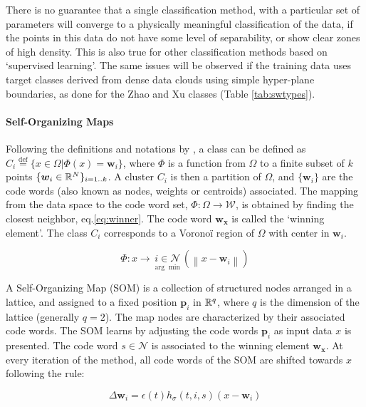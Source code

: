 There is no guarantee that a single classification method, with a particular set of parameters will converge to a physically meaningful classification of the data, if the points in this data do not have some level of separability, or show clear zones of high density. This is also true for other classification methods based on `supervised learning'. The same issues will be observed if the training data uses target classes derived from dense data clouds using simple hyper-plane boundaries, as done for the Zhao and Xu classes (Table \ref{tab:swtypes}).

\paragraph{Self-Organizing Maps}
Following the definitions and notations by \citep{[REF 23 in ROUGIER??]}, a class can be defined as $C_i\overset{\text{def}}{=} \{x\in\Omega | \Phi(x)=\boldsymbol{w}_i\}$, where $\Phi$ is a function from $\Omega$ to a finite subset of $k$ points $\{\boldsymbol{w}_i\in\Bbb R^N\}_{i=1..k}$. A cluster $C_i$ is then a partition of $\Omega$, and $\{\boldsymbol{w}_i\}$ are the code words (also known as nodes, weights or centroids) associated. The mapping from the data space to the code word set, $\Phi: \Omega\rightarrow\mathcal{W}$, is obtained by finding the closest neighbor, eq.\eqref{eq:winner}. The code word $\boldsymbol{w_x}$ is called the `winning element'. The class $C_i$ corresponds to a Vorono\"i region of $\Omega$ with center in $\boldsymbol{w}_i$.

\begin{equation}
\Phi: x \rightarrow  \underset{\arg\min}{i\in\mathcal{N}}\left( \left\lVert x - \boldsymbol{w}_i \right\rVert \right) \label{eq:winner}
\end{equation}

A Self-Organizing Map (SOM) is a collection of structured nodes arranged in a lattice, and assigned to a fixed position $\boldsymbol{p}_i$ in $\Bbb R^q$, where $q$ is the dimension of the lattice (generally $q=2$). The map nodes are characterized by their associated code words. The SOM learns by adjusting the code words $\boldsymbol{p}_i$ as input data $x$ is presented. The code word $s \in \mathcal{N}$ is associated to the winning element $\boldsymbol{w_x}$. At every iteration of the method, all code words of the SOM are shifted towards $x$ following the rule:

\begin{equation}
\Delta \boldsymbol{w}_i = \epsilon(t)h_\sigma(t,i,s)(x-\boldsymbol{w}_i) \label{eq:learnsom}
\end{equation}

